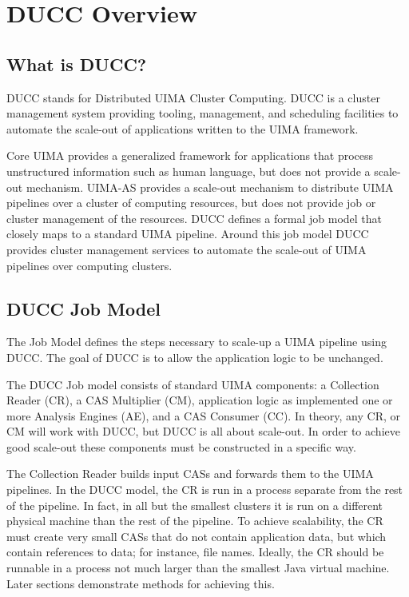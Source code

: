\ifpdf
\else
{}
\fi
\chapter{DUCC Overview}

    \section{What is DUCC?}

    DUCC stands for Distributed UIMA Cluster Computing. DUCC is a cluster management system
    providing tooling, management, and scheduling facilities to automate the scale-out of
    applications written to the UIMA framework.

    Core UIMA provides a generalized framework for applications that process unstructured
    information such as human language, but does not provide a scale-out mechanism. UIMA-AS provides
    a scale-out mechanism to distribute UIMA pipelines over a cluster of computing resources, but
    does not provide job or cluster management of the resources. DUCC defines a formal job model
    that closely maps to a standard UIMA pipeline. Around this job model DUCC provides cluster
    management services to automate the scale-out of UIMA pipelines over computing clusters.

    \section{DUCC Job Model}

    The Job Model defines the steps necessary to scale-up a UIMA pipeline using DUCC.  The goal of
    DUCC is to allow the application logic to be unchanged.

    The DUCC Job model consists of standard UIMA components: a Collection Reader (CR), a CAS
    Multiplier (CM), application logic as implemented one or more Analysis Engines (AE), and a CAS
    Consumer (CC).  In theory, any CR, or CM will work with DUCC, but DUCC is all about scale-out.  In
    order to achieve good scale-out these components must be constructed in a specific way.

    The Collection Reader builds input CASs and forwards them to the UIMA pipelines.  In the DUCC
    model, the CR is run in a process separate from the rest of the pipeline. In fact, in all but the
    smallest clusters it is run on a different physical machine than the rest of the pipeline.  To
    achieve scalability, the CR must create very small CASs that do not contain application data,
    but which contain references to data; for instance, file names.  Ideally, the CR should be
    runnable in a process not much larger than the smallest Java virtual machine.  Later sections
    demonstrate methods for achieving this.

